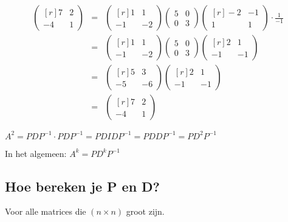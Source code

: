 \begin{eqnarray*}
	\begin{pmatrix*}[r] 7 & 2 \\ -4 & 1 \end{pmatrix*} &=& \begin{pmatrix*}[r] 1 & 1 \\ -1 & -2 \end{pmatrix*} \begin{pmatrix} 5 & 0 \\ 0 & 3 \end{pmatrix} \begin{pmatrix*}[r] -2 & -1 \\ 1 & 1\end{pmatrix*} \cdot \frac{1}{-1} \\
	&=& \begin{pmatrix*}[r] 1 & 1 \\ -1 & -2 \end{pmatrix*} \begin{pmatrix} 5 & 0 \\ 0 & 3 \end{pmatrix} \begin{pmatrix*}[r] 2 & 1 \\ -1 & -1\end{pmatrix*} \\
	&=& \begin{pmatrix*}[r] 5 & 3 \\ -5 & -6 \end{pmatrix*} \begin{pmatrix*}[r] 2 & 1 \\ -1 & -1\end{pmatrix*} \\
	&=& \begin{pmatrix*}[r]	7 & 2 \\ -4 & 1 \end{pmatrix*}
\end{eqnarray*}

$A^2 = PDP^{-1} \cdot PDP^{-1} = PDIDP^{-1} = PDDP^{-1} = PD^2P^{-1}$

In het algemeen: $A^k = PD^kP^{-1}$

\subsection{Hoe bereken je P en D?}
Voor alle matrices die $(n \times n)$ groot zijn.
